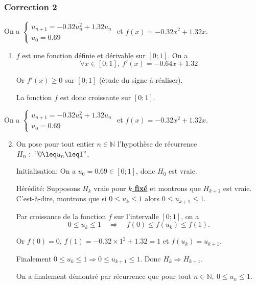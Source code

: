 \documentclass[15pt, mathserif]{beamer}
\begin{document}
\begin{frame}
\vspace{-10mm}
	\frametitle{Correction 2}
On a $\begin{cases} u_{n+1} = -0.32u_n^2+1.32u_n\\[1em] u_0 = 0.69\end{cases}$ et $f(x) = -0.32x^2+1.32x$.

\begin{enumerate}
	\item $f$ est une fonction définie et dérivable sur $[0;1]$. On a \[\forall x \in [0;1], ~ f'(x) = -0.64x+1.32\]

 Or $f'(x) \geq 0$ sur $[0;1]$ (étude du signe à réaliser). 

La fonction $f$ est donc croissante sur $[0;1]$.

\end{enumerate}
\end{frame}


\begin{frame}On a $\begin{cases} u_{n+1} = -0.32u_n^2+1.32u_n\\[1em] u_0 = 0.69\end{cases}$ et $f(x) = -0.32x^2+1.32x$.

\begin{enumerate}\setcounter{enumi}{1}

	\item On pose pour tout entier $n \in \mathbb{N}$ l'hypothèse de récurrence $H_n:~"0 \leq u_n \leq 1"$.

\medskip

Initialisation: On a $u_0 =0.69 \in [0;1]$, donc $H_0$ est vraie.

\medskip

Hérédité: Supposons $H_k$ vraie pour \textbf\underline{{$k$ fixé}} et montrons que $H_{k+1}$ est vraie. C'est-à-dire, montrons que si $0 \leq u_k \leq 1$ alors $0 \leq u_{k+1} \leq 1$.

 Par croissance de la fonction $f$ sur l'intervalle $[0;1]$, on a \[0\leq u_k \leq 1 \quad \Rightarrow \quad f(0) \leq f(u_k) \leq f(1).\]

 Or $f(0) = 0$, $f(1) = -0.32\times 1^2+1.32= 1$ et $f(u_k) = u_{k+1}$.

 Finalement $0\leq u_k \leq 1 \Rightarrow 0 \leq u_{k+1} \leq 1$. Donc $H_{k} \Rightarrow H_{k+1}$.

 On a finalement démontré par récurrence que pour tout $n \in\mathbb{N},~ 0 \leq u_n \leq 1$.

\end{enumerate}
\end{frame}
\end{document}
